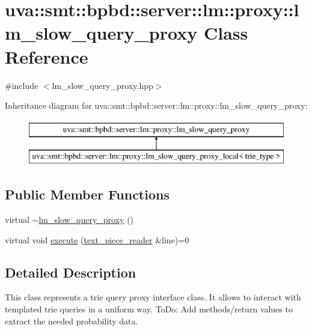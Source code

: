 \hypertarget{classuva_1_1smt_1_1bpbd_1_1server_1_1lm_1_1proxy_1_1lm__slow__query__proxy}{}\section{uva\+:\+:smt\+:\+:bpbd\+:\+:server\+:\+:lm\+:\+:proxy\+:\+:lm\+\_\+slow\+\_\+query\+\_\+proxy Class Reference}
\label{classuva_1_1smt_1_1bpbd_1_1server_1_1lm_1_1proxy_1_1lm__slow__query__proxy}


{\ttfamily \#include $<$lm\+\_\+slow\+\_\+query\+\_\+proxy.\+hpp$>$}

Inheritance diagram for uva\+:\+:smt\+:\+:bpbd\+:\+:server\+:\+:lm\+:\+:proxy\+:\+:lm\+\_\+slow\+\_\+query\+\_\+proxy\+:\begin{figure}[H]
\begin{center}
\leavevmode
\includegraphics[height=2.000000cm]{classuva_1_1smt_1_1bpbd_1_1server_1_1lm_1_1proxy_1_1lm__slow__query__proxy}
\end{center}
\end{figure}
\subsection*{Public Member Functions}
\begin{DoxyCompactItemize}
\item 
virtual \hyperlink{classuva_1_1smt_1_1bpbd_1_1server_1_1lm_1_1proxy_1_1lm__slow__query__proxy_a53222e4917ec99a2c5036dbfbf27564d}{$\sim$lm\+\_\+slow\+\_\+query\+\_\+proxy} ()
\item 
virtual void \hyperlink{classuva_1_1smt_1_1bpbd_1_1server_1_1lm_1_1proxy_1_1lm__slow__query__proxy_aae7c3726774ded484d4757039d28e138}{execute} (\hyperlink{classuva_1_1utils_1_1file_1_1text__piece__reader}{text\+\_\+piece\+\_\+reader} \&line)=0
\end{DoxyCompactItemize}


\subsection{Detailed Description}
This class represents a trie query proxy interface class. It allows to interact with templated trie queries in a uniform way. To\+Do\+: Add methods/return values to extract the needed probability data. 

